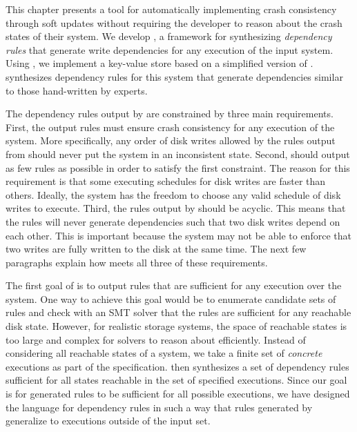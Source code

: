 This chapter presents a tool for automatically implementing crash consistency through soft updates
without requiring the developer to reason about the crash states of their system. We develop
\depsynth, a framework for synthesizing \textit{dependency rules} that generate write dependencies
for any execution of the input system. Using \depsynth, we implement a key-value store based
on a simplified version of . \depsynth synthesizes dependency rules for this
system that generate dependencies similar to those hand-written by experts.

The dependency rules output by \depsynth are constrained by three main requirements. First, the output
rules must ensure crash consistency for any execution of the system. More specifically, any
order of disk writes allowed by the rules output from \depsynth should never put the system in an
inconsistent state. Second, \depsynth should output as few rules as possible in order to satisfy the first
constraint. The reason for this requirement is that some executing schedules for disk writes are faster than
others. Ideally, the system has the freedom to choose any valid schedule of disk writes to execute. Third,
the rules output by \depsynth should be acyclic. This means that the rules will never generate dependencies
such that two disk writes depend on each other. This is important because the system may not be able to enforce
that two writes are fully written to the disk at the same time. The next few paragraphs explain how \depsynth
meets all three of these requirements.

The first goal of \depsynth is to output rules that are sufficient for any execution over the system. One way to
achieve this goal would be to enumerate candidate sets of rules and check with an SMT solver that
the rules are sufficient for any reachable disk state. However, for realistic storage systems, the space of
reachable states is too large and complex for solvers to reason about efficiently. Instead of considering
all reachable states of a system, we take a finite set of \textit{concrete} executions as part of the
specification. \depsynth then synthesizes a set of dependency rules sufficient for all states reachable
in the set of specified executions. Since our goal is for generated rules to be sufficient for all
possible executions, we have designed the language for dependency rules in such a way that rules
generated by \depsynth generalize to executions outside of the input set.


